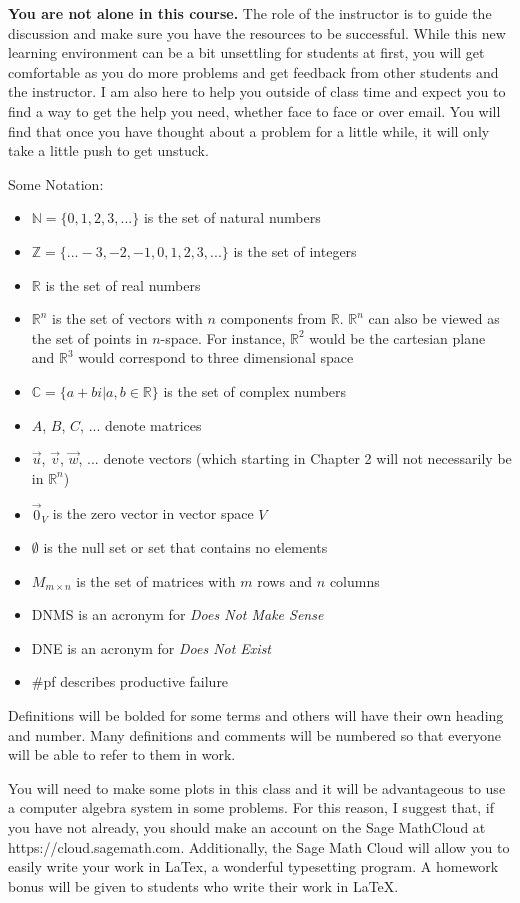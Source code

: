 \textbf{You are not alone in this course.} The role of the instructor is to guide the discussion and make sure you have the resources to be successful. While this new learning environment can be a bit unsettling for students at first, you will get comfortable as you do more problems and get feedback from other students and the instructor. I am also here to help you outside of class time and expect you to find a way to get the help you need, whether face to face or over email. You will find that once you have thought about a problem for a little while, it will only take a little push to get unstuck.

Some Notation:
\begin{itemize}
\item $\mathbb{N}=\{0,1,2,3,...\}$ is the set of natural numbers
\item $\mathbb{Z}=\{...-3,-2,-1,0,1,2,3,...\}$ is the set of integers
\item $\mathbb{R}$ is the set of real numbers
\item $\mathbb{R}^n$ is the set of vectors with $n$ components from $\mathbb{R}$. $\mathbb{R}^n$ can also be viewed as the set of points in $n$-space. For instance, $\mathbb{R}^2$ would be the cartesian plane and $\mathbb{R}^3$ would correspond to three dimensional space
\item $\mathbb{C}=\{a+b i | a,b \in \mathbb{R}\}$ is the set of complex numbers
\item $A$, $B$, $C$, ... denote matrices
\item $\vec{u}$, $\vec{v}$, $\vec{w}$, ... denote vectors (which starting in Chapter 2 will not necessarily be in $\mathbb{R}^n$)
\item $\vec{0}_V$ is the zero vector in vector space $V$
\item $\emptyset$ is the null set or set that contains no elements
\item $M_{m \times n}$ is the set of matrices with $m$ rows and $n$ columns
\item DNMS is an acronym for \textit{Does Not Make Sense}
\item DNE is an acronym for \textit{Does Not Exist}
\item \#pf describes productive failure
\end{itemize}
Definitions will be bolded for some terms and others will have their own heading and number. Many definitions and comments will be numbered so that everyone will be able to refer to them in work.

You will need to make some plots in this class and it will be advantageous to use a computer algebra system in some problems. For this reason, I suggest that, if you have not already, you should make an account on the Sage MathCloud at https://cloud.sagemath.com. Additionally, the Sage Math Cloud will allow you to easily write your work in LaTex, a wonderful typesetting program. A homework bonus will be given to students who write their work in LaTeX.


